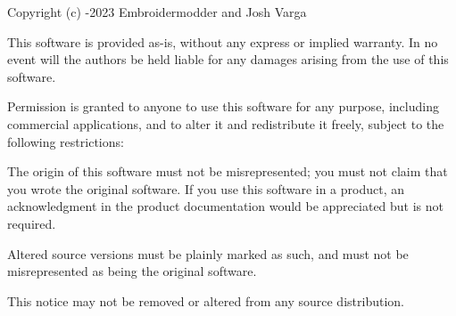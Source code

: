 Copyright (c) {-\/2023} {\ttfamily Embroidermodder and Josh Varga}

This software is provided \textquotesingle{}as-\/is\textquotesingle{}, without any express or implied warranty. In no event will the authors be held liable for any damages arising from the use of this software.

Permission is granted to anyone to use this software for any purpose, including commercial applications, and to alter it and redistribute it freely, subject to the following restrictions\+:


\begin{DoxyEnumerate}
\item The origin of this software must not be misrepresented; you must not claim that you wrote the original software. If you use this software in a product, an acknowledgment in the product documentation would be appreciated but is not required.
\item Altered source versions must be plainly marked as such, and must not be misrepresented as being the original software.
\item This notice may not be removed or altered from any source distribution. 
\end{DoxyEnumerate}